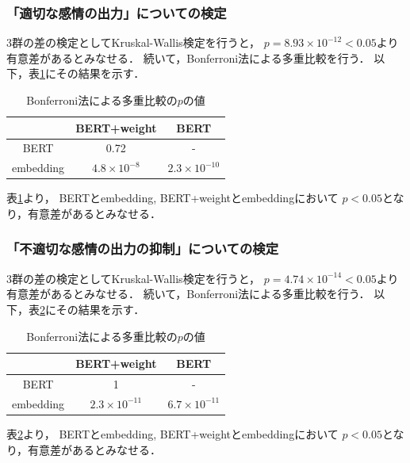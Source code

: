 	\subsubsection{「適切な感情の出力」についての検定}
		3群の差の検定としてKruskal-Wallis検定を行うと，
		$p=8.93\times10^{-12}<0.05$より有意差があるとみなせる．
		続いて，Bonferroni法\cite{bonferroni}による多重比較を行う．
		以下，表\ref{table:jikken2_good_Bonferroni}にその結果を示す．
		\begin{table}[H]
			\centering
			\caption{Bonferroni法による多重比較の$p$の値}
			\label{table:jikken2_good_Bonferroni}
			\begin{tabular}{|c|c|c|}
				\hline
				& BERT+weight & BERT \\
				\hline
				BERT & 0.72 & - \\
				\hline
				embedding & $4.8\times10^{-8}$ & $2.3\times10^{-10}$ \\
				\hline
			\end{tabular}
		\end{table}
		表\ref{table:jikken2_good_Bonferroni}より，
		BERTとembedding, BERT+weightとembeddingにおいて
		$p<0.05$となり，有意差があるとみなせる．
	\subsubsection{「不適切な感情の出力の抑制」についての検定}
		3群の差の検定としてKruskal-Wallis検定を行うと，
		$p=4.74\times10^{-14}<0.05$より有意差があるとみなせる．
		続いて，Bonferroni法による多重比較を行う．
		以下，表\ref{table:jikken2_bad_Bonferroni}にその結果を示す．
		\begin{table}[H]
			\centering
			\caption{Bonferroni法による多重比較の$p$の値}
			\label{table:jikken2_bad_Bonferroni}
			\begin{tabular}{|c|c|c|}
				\hline
				& BERT+weight & BERT \\
				\hline
				BERT & 1 & - \\
				\hline
				embedding & $2.3\times10^{-11}$ & $6.7\times10^{-11}$ \\
				\hline
			\end{tabular}
		\end{table}
		表\ref{table:jikken2_bad_Bonferroni}より，
		BERTとembedding, BERT+weightとembeddingにおいて
		$p<0.05$となり，有意差があるとみなせる．
